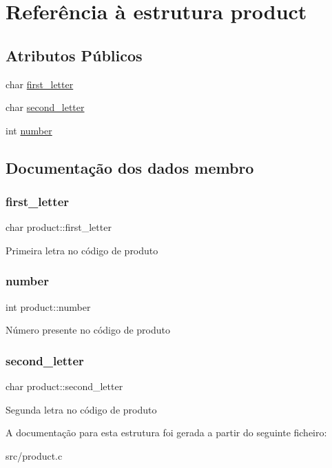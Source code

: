 \hypertarget{structproduct}{}\section{Referência à estrutura product}
\label{structproduct}
\subsection*{Atributos Públicos}
\begin{DoxyCompactItemize}
\item 
char \hyperlink{structproduct_a57b71522c9e272a50d260c12dbdb197a}{first\+\_\+letter}
\item 
char \hyperlink{structproduct_a39b2dd710cbbdc865b7e3ec65dcaadf5}{second\+\_\+letter}
\item 
int \hyperlink{structproduct_a19b2ac1d3bd8b88a059553d3050ed0c8}{number}
\end{DoxyCompactItemize}


\subsection{Documentação dos dados membro}
\mbox{\label{structproduct_a57b71522c9e272a50d260c12dbdb197a}} 
\subsubsection{\texorpdfstring{first\+\_\+letter}{first\_letter}}
{\footnotesize\ttfamily char product\+::first\+\_\+letter}

Primeira letra no código de produto \mbox{\label{structproduct_a19b2ac1d3bd8b88a059553d3050ed0c8}} 
\subsubsection{\texorpdfstring{number}{number}}
{\footnotesize\ttfamily int product\+::number}

Número presente no código de produto \mbox{\label{structproduct_a39b2dd710cbbdc865b7e3ec65dcaadf5}} 
\subsubsection{\texorpdfstring{second\+\_\+letter}{second\_letter}}
{\footnotesize\ttfamily char product\+::second\+\_\+letter}

Segunda letra no código de produto 

A documentação para esta estrutura foi gerada a partir do seguinte ficheiro\+:\begin{DoxyCompactItemize}
\item 
src/product.\+c\end{DoxyCompactItemize}
